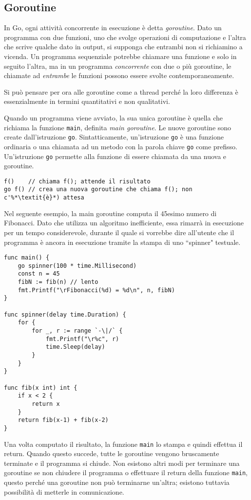 \documentclass[../../thesis.tex]{subfiles}
\begin{document}
    \subsection{Goroutine}\label{subsec:goroutine}
    In Go, ogni attività concorrente in esecuzione è detta \textit{goroutine}.
    Dato un programma con due funzioni, uno che svolge operazioni di computazione e l'altra che scrive qualche dato in output, si supponga che entrambi non si richiamino a vicenda.
    Un programma sequenziale potrebbe chiamare una funzione e solo in seguito l'altra, ma in un programma \textit{concorrente} con due o più goroutine, le chiamate ad \textit{entrambe} le funzioni possono essere svolte contemporaneamente.
    \hfill \vspace{12pt}

    Si può pensare per ora alle goroutine come a thread perché la loro differenza è essenzialmente in termini quantitativi e non qualitativi.
    \hfill \vspace{12pt}

    Quando un programma viene avviato, la sua unica goroutine è quella che richiama la funzione \verb"main", definita \textit{main goroutine}.
    Le nuove goroutine sono create dall'istruzione \verb"go".
    Sintatticamente, un'istruzione \verb"go" è una funzione ordinaria o una chiamata ad un metodo con la parola chiave \verb"go" come prefisso.
    Un'istruzione \verb"go" permette alla funzione di essere chiamata da una nuova e goroutine.
    \begin{lstlisting}[frame = single,label={lst:lstlisting7-1.1}]
f()    // chiama f(); attende il risultato
go f() // crea una nuova goroutine che chiama f(); non c'%*\textit{è}*) attesa
    \end{lstlisting}
    Nel seguente esempio, la main goroutine computa il 45esimo numero di Fibonacci.
    Dato che utilizza un algoritmo inefficiente, essa rimarrà in esecuzione per un tempo considerevole, durante il quale si vorrebbe dire all'utente che il programma è ancora in esecuzione tramite la stampa di uno ``spinner" testuale.
    \begin{lstlisting}[frame = single,label={lst:lstlisting7-1.2}]
func main() {
    go spinner(100 * time.Millisecond)
    const n = 45
    fibN := fib(n) // lento 
    fmt.Printf("\rFibonacci(%d) = %d\n", n, fibN)
}

func spinner(delay time.Duration) {
    for {
        for _, r := range `-\|/` {
            fmt.Printf("\r%c", r)
            time.Sleep(delay)
        }
    }
}

func fib(x int) int {
    if x < 2 {
        return x
    }
    return fib(x-1) + fib(x-2)
}
    \end{lstlisting}
    Una volta computato il risultato, la funzione \verb"main" lo stampa e quindi effettua il return.
    Quando questo succede, tutte le goroutine vengono bruscamente terminate e il programma si chiude.
    Non esistono altri modi per terminare una goroutine se non chiudere il programma o effettuare il return della funzione \verb"main", questo perché una goroutine non può terminarne un'altra;
    esistono tuttavia possibilità di metterle in comunicazione.
\end{document}
